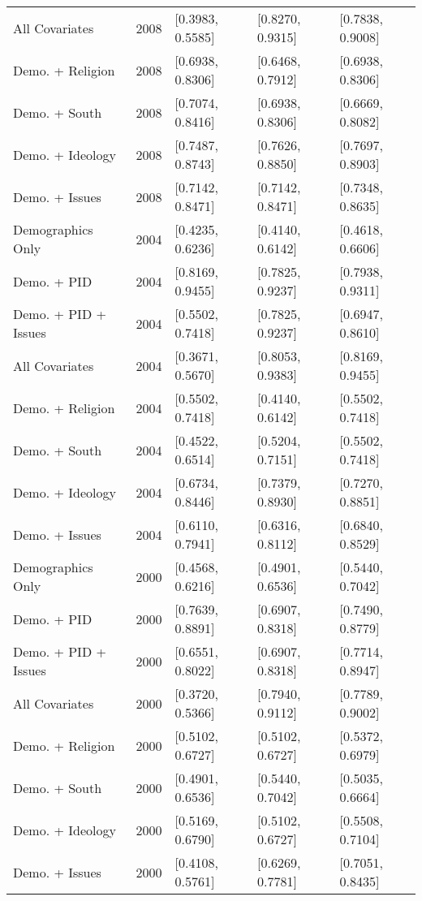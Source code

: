 \begin{longtable}{lrlll}
  All Covariates & 2008 & [0.3983, 0.5585] & [0.8270, 0.9315] & [0.7838, 0.9008] \\ 
  Demo. + Religion & 2008 & [0.6938, 0.8306] & [0.6468, 0.7912] & [0.6938, 0.8306] \\ 
  Demo. + South & 2008 & [0.7074, 0.8416] & [0.6938, 0.8306] & [0.6669, 0.8082] \\ 
  Demo. + Ideology & 2008 & [0.7487, 0.8743] & [0.7626, 0.8850] & [0.7697, 0.8903] \\ 
  Demo. + Issues & 2008 & [0.7142, 0.8471] & [0.7142, 0.8471] & [0.7348, 0.8635] \\ 
  Demographics Only & 2004 & [0.4235, 0.6236] & [0.4140, 0.6142] & [0.4618, 0.6606] \\ 
  Demo. + PID & 2004 & [0.8169, 0.9455] & [0.7825, 0.9237] & [0.7938, 0.9311] \\ 
  Demo. + PID + Issues & 2004 & [0.5502, 0.7418] & [0.7825, 0.9237] & [0.6947, 0.8610] \\ 
  All Covariates & 2004 & [0.3671, 0.5670] & [0.8053, 0.9383] & [0.8169, 0.9455] \\ 
  Demo. + Religion & 2004 & [0.5502, 0.7418] & [0.4140, 0.6142] & [0.5502, 0.7418] \\ 
  Demo. + South & 2004 & [0.4522, 0.6514] & [0.5204, 0.7151] & [0.5502, 0.7418] \\ 
  Demo. + Ideology & 2004 & [0.6734, 0.8446] & [0.7379, 0.8930] & [0.7270, 0.8851] \\ 
  Demo. + Issues & 2004 & [0.6110, 0.7941] & [0.6316, 0.8112] & [0.6840, 0.8529] \\ 
  Demographics Only & 2000 & [0.4568, 0.6216] & [0.4901, 0.6536] & [0.5440, 0.7042] \\ 
  Demo. + PID & 2000 & [0.7639, 0.8891] & [0.6907, 0.8318] & [0.7490, 0.8779] \\ 
  Demo. + PID + Issues & 2000 & [0.6551, 0.8022] & [0.6907, 0.8318] & [0.7714, 0.8947] \\ 
  All Covariates & 2000 & [0.3720, 0.5366] & [0.7940, 0.9112] & [0.7789, 0.9002] \\ 
  Demo. + Religion & 2000 & [0.5102, 0.6727] & [0.5102, 0.6727] & [0.5372, 0.6979] \\ 
  Demo. + South & 2000 & [0.4901, 0.6536] & [0.5440, 0.7042] & [0.5035, 0.6664] \\ 
  Demo. + Ideology & 2000 & [0.5169, 0.6790] & [0.5102, 0.6727] & [0.5508, 0.7104] \\ 
  Demo. + Issues & 2000 & [0.4108, 0.5761] & [0.6269, 0.7781] & [0.7051, 0.8435] \\ 

\end{longtable}
